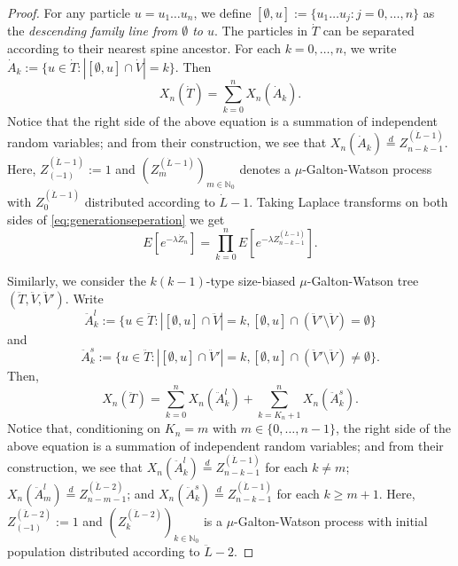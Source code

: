 \documentclass[12pt,a4paper]{amsart}
\numberwithin{equation}{section}
\begin{document}
\begin{proof}
	For any particle $u=u_1\dots u_n$, we define
$	[\emptyset, u]
	:= \{u_1\dots u_j:j=0,\dots, n \}$
	as the \emph{descending family line from $\emptyset$ to $u$}.
	The particles in $\dot T$ can be separated according to their nearest spine ancestor.
	For each $k = 0, \dots, n$, we write
$\dot A_k
	:= \{u\in\dot T:| [\emptyset, u] \cap \dot V |=k\}.$
	Then
\begin{equation}
\label{eq:generationseperation}
		X_n(\dot T)
	=
		\sum_{k=0}^nX_n(\dot A_k).
\end{equation}
	Notice that the right side of the above equation is a summation of independent random variables;
	and from their construction, we see that $X_n(\dot A_k) \overset{d}= Z_{n-k-1}^{(\dot L - 1)}$.
	Here,  $Z^{(\dot L - 1)}_{(-1)}:= 1$ and $(Z^{(\dot L - 1)}_m)_{m\in \mathbb N_0}$ denotes a $\mu$-Galton-Watson process with $Z_0^{(\dot L - 1)}$ distributed according to $\dot L - 1$.
	Taking	Laplace transforms
	on both sides of \eqref{eq:generationseperation} we get
\begin{equation} \label{eq: laplace transform of one-spine decomposition}
	E [e^{-\lambda \dot Z_n}]
	= \prod_{k = 0}^n E[ e^{-\lambda Z^{(\dot L - 1)}_{n-k-1}} ].
\end{equation}
	
	Similarly, we consider the $k(k-1)$-type size-biased $\mu$-Galton-Watson tree $(\ddot T,\ddot V,\ddot V')$.
	Write
\[
	\ddot A^l_k := \{u\in\ddot T: | [\emptyset, u]\cap \ddot V | = k, [\emptyset , u] \cap (\ddot V' \setminus \ddot V ) = \emptyset\}
\]
	and
\[
	\ddot A^s_k := \{u\in\ddot T: | [\emptyset, u]\cap \ddot V' | = k, [\emptyset , u] \cap (\ddot V' \setminus \ddot V) \neq \emptyset\}.
\]
	Then, 
\begin{equation}\label{eq:rawtwospinedecomposition}
		X_n(\ddot T)
	=
		\sum_{k=0}^nX_n(\ddot A^l_k) + \sum_{k=K_n + 1}^n X_n(\ddot A^s_k).
\end{equation}
	Notice that, conditioning on $K_n = m$ with $m\in\{0,\dots,n-1\}$, the right side of the above equation is a summation of independent random variables; and from their construction, we see that
	$X_n(\ddot A^l_k) \overset{d}{=} Z^{(\dot L - 1)}_{n-k-1}$
	for each $k \neq m$;
	$X_n(\ddot A^l_m) \overset{d}{=} Z^{(\ddot L - 2)}_{n-m-1}$;
	and $X_n(\ddot A^s_k) \overset{d}{=} Z^{(\dot L - 1)}_{n-k-1}$ for each $k \geq m+1$.
	Here, $Z^{(\ddot L - 2)}_{(-1)}:= 1$ and $(Z^{(\ddot L - 2)}_k)_{k\in \mathbb N_0}$ is a $\mu$-Galton-Watson process with initial population distributed according to $\ddot L-2$.


\end{proof}
\end{document}
